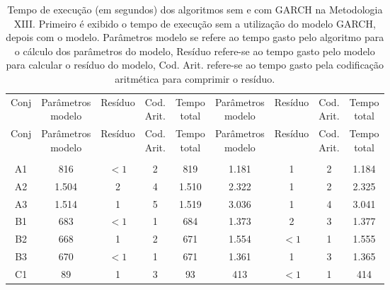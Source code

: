 \begin{center}
\begin{longtable}{ccccc|cccc}
\toprule
\rowcolor{white}
\caption[Metodologia XIII: tempo de execução]{Tempo de execução (em segundos)
dos algoritmos sem e com GARCH na Metodologia XIII. Primeiro é exibido o tempo de
execução sem a utilização do modelo GARCH, depois com o modelo. Parâmetros
modelo se refere ao tempo gasto pelo algoritmo para o cálculo dos parâmetros do
modelo, Resíduo refere-se ao tempo gasto pelo modelo para calcular o resíduo do
modelo, Cod. Arit. refere-se ao tempo gasto pela codificação aritmética para
comprimir o resíduo.} \label{tab:EvolucaoEntropiaMet13}\\
\midrule
Conj & \specialcell{Parâmetros\\modelo} &
Resíduo & \specialcell{Cod.\\Arit.} & \specialcell{Tempo\\total} &
\specialcell{Parâmetros\\modelo} &
Resíduo & \specialcell{Cod.\\Arit.} & \specialcell{Tempo\\total} \\
\midrule
\endfirsthead 
\midrule
\rowcolor{white}
Conj & \specialcell{Parâmetros\\modelo} &
Resíduo & \specialcell{Cod.\\Arit.} & \specialcell{Tempo\\total} &
\specialcell{Parâmetros\\modelo} &
Resíduo & \specialcell{Cod.\\Arit.} & \specialcell{Tempo\\total} \\
\toprule
\endhead
\midrule \\ %
\endfoot
\bottomrule 
\endlastfoot
A1&816&$<1$&2&819&1.181&1&2&1.184\\
A2&1.504&2&4&1.510&2.322&1&2&2.325\\
A3&1.514&1&5&1.519&3.036&1&4&3.041\\
B1&683&$<1$&1&684&1.373&2&3&1.377\\
B2&668&1&2&671&1.554&$<1$&1&1.555\\
B3&670&$<1$&1&671&1.361&1&3&1.365\\
C1&89&1&3&93&413&$<1$&1&414\\

\end{longtable}
\end{center}
